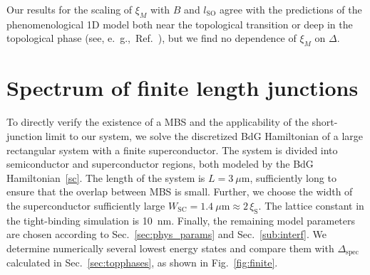 Our results for the scaling of $\xi_M$ with $B$ and $l_\textrm{SO}$ agree with the predictions of the phenomenological 1D model both near the topological transition or deep in the topological phase (see, e.~g.,~Ref.~\cite{Klinovaja2012}), but we find no dependence of $\xi_M$ on $\Delta$.

\section{Spectrum of finite length junctions}
\label{sec:finite}

To directly verify the existence of a MBS and the applicability of the short-junction limit to our system, we solve the discretized BdG Hamiltonian of a large rectangular system with a finite superconductor.
The system is divided into semiconductor and superconductor regions, both modeled by the BdG Hamiltonian~\eqref{sc}.
The length of the system is $L=\SI{3}{\mu \m}$, sufficiently long to ensure that the overlap between MBS is small.
Further, we choose the width of the superconductor sufficiently large $W_\mathrm{SC}=\SI{1.4}{\mu\m} \approx 2\,\xi_\mathrm S$.
The lattice constant in the tight-binding simulation is \SI{10}{\nm}.
Finally, the remaining model parameters are chosen according to Sec.~\ref{sec:phys_params} and Sec.~\ref{sub:interf}.
We determine numerically several lowest energy states and compare them with $\Delta_\textrm{spec}$ calculated in Sec.~\ref{sec:topphases}, as shown in Fig.~\ref{fig:finite}.

